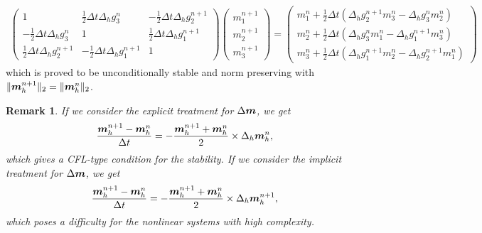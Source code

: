\documentclass[preprint,times,3p]{elsarticle}
\newtheorem{remark}{Remark}
\def\m{\mbox{\boldmath $m$}}
\begin{document}
\begin{itemize}
\begin{align}
\begin{pmatrix}
	1&\frac12 \Delta t \Delta_hg_3^n&-\frac12 \Delta t \Delta_hg_2^{n+1}\\
	-\frac12 \Delta t\Delta_hg_3^n&1&\frac12 \Delta t\Delta_hg_1^{n+1}\\
	\frac12 \Delta t\Delta_hg_2^{n+1}&-\frac12 \Delta t\Delta_h g_1^{n+1}&1
	\end{pmatrix}\begin{pmatrix}
	m_1^{n+1}\\
	m_2^{n+1}\\
	m_3^{n+1}
	\end{pmatrix}=\begin{pmatrix}
	m_1^n+\frac12 \Delta t(\Delta_hg_2^{n+1} m_3^n-\Delta_hg_3^n m_2^n)\\
	m_2^n+\frac12 \Delta t(\Delta_hg_3^n m_1^n-\Delta_hg_1^{n+1} m_3^n)\\
	m_3^n+\frac12 \Delta t(\Delta_hg_1^{n+1}m_2^n-\Delta_hg_2^{n+1} m_1^n)
	\end{pmatrix}
	\end{align}
    which is proved to be unconditionally stable and norm preserving with $\|\m_h^{n+1}\|_2=\|\m_h^n\|_2$.
    \end{itemize}

\begin{remark}
If we consider the explicit treatment for $\Delta \m$, we get 
	\begin{align}\label{eq-CN_2}
	\frac{\m_h^{n+1}-\m_h^n}{\Delta t}=-\frac{\m_h^{n+1}+\m_h^n}{2} \times \Delta_h \m_h^n,
	\end{align}
	which gives a CFL-type condition for the stability.
If we consider the implicit treatment for $\Delta \m$, we get
	\begin{align}\label{eq-CN_3}
	\frac{\m_h^{n+1}-\m_h^n}{\Delta t}=-\frac{\m_h^{n+1}+\m_h^n}{2} \times \Delta_h \m_h^{n+1},
	\end{align}
	which poses a difficulty for the nonlinear systems with high complexity.
\end{remark}
\end{document}
